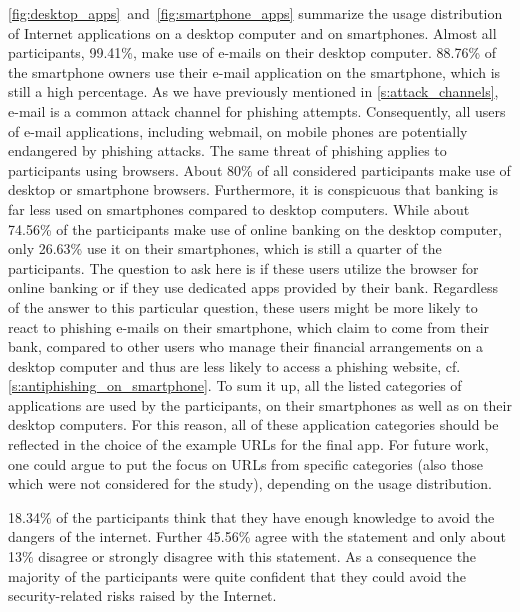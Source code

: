 \begin{description}[leftmargin=0cm]
	
	\item[Usage Distribution of Internet Applications] \autoref{fig:desktop_apps}~and~\autoref{fig:smartphone_apps} summarize the usage distribution of Internet applications on a desktop computer and on smartphones.
 Almost all participants, 99.41\%, make use of e-mails on their desktop computer.
 88.76\% of the smartphone owners use their e-mail application on the smartphone, which is still a high percentage.
 As we have previously mentioned in \autoref{s:attack_channels}, e-mail is a common attack channel for phishing attempts.
 Consequently, all users of e-mail applications, including webmail, on mobile phones are potentially endangered by phishing attacks.
 The same threat of phishing applies to participants using browsers.
 About 80\% of all considered participants make use of desktop or smartphone browsers.
 Furthermore, it is conspicuous that banking is far less used on smartphones compared to desktop computers.
 While about 74.56\% of the participants make use of online banking on the desktop computer, only 26.63\% use it on their smartphones, which is still a quarter of the participants.
	The question to ask here is if these users utilize the browser for online banking or if they use dedicated apps provided by their bank.
 Regardless of the answer to this particular question, these users might be more likely to react to phishing e-mails on their smartphone, which claim to come from their bank, compared to other users who manage their financial arrangements on a desktop computer and thus are less likely to access a phishing website, cf. \autoref{s:antiphishing_on_smartphone}. To sum it up, all the listed categories of applications are used by the participants, on their smartphones as well as on their desktop computers.
 For this reason, all of these application categories should be reflected in the choice of the example URLs for the final app.
 For future work, one could argue to put the focus on URLs from specific categories (also those which were not considered for the study), depending on the usage distribution.


	\item[Self-Assessment - Knowledge to avoid dangers of Internet] 18.34\% of the participants think that they have enough knowledge to avoid the dangers of the internet.
 Further 45.56\% agree with the statement and only about 13\% disagree or strongly disagree with this statement.
 As a consequence the majority of the participants were quite confident that they could avoid the security-related risks raised by the Internet.
 

\end{description}
